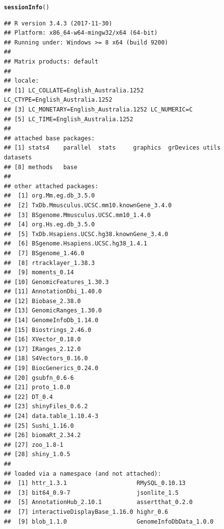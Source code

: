 \documentclass[12pt]{article}\usepackage[]{graphicx}\usepackage[]{color}
\makeatletter
\newcommand{\hlstd}[1]{\textcolor[rgb]{0.345,0.345,0.345}{#1}}%
\newcommand{\hlkwd}[1]{\textcolor[rgb]{0.737,0.353,0.396}{\textbf{#1}}}%
\newenvironment{kframe}{%
 \def\at@end@of@kframe{}%
 \ifinner\ifhmode%
  \def\at@end@of@kframe{\end{minipage}}%
  \begin{minipage}{\columnwidth}%
 \fi\fi%
 \def\FrameCommand##1{\hskip\@totalleftmargin \hskip-\fboxsep
 \colorbox{shadecolor}{##1}\hskip-\fboxsep
     \hskip-\linewidth \hskip-\@totalleftmargin \hskip\columnwidth}%
 \MakeFramed {\advance\hsize-\width
   \@totalleftmargin\z@ \linewidth\hsize
   \@setminipage}}%
 {\par\unskip\endMakeFramed%
 \at@end@of@kframe}
\newenvironment{knitrout}{}{} %
\makeatother
\begin{document}
\begin{knitrout}
\color{fgcolor}\begin{kframe}
\begin{alltt}
\hlkwd{sessionInfo}\hlstd{()}
\end{alltt}
\begin{verbatim}
## R version 3.4.3 (2017-11-30)
## Platform: x86_64-w64-mingw32/x64 (64-bit)
## Running under: Windows >= 8 x64 (build 9200)
## 
## Matrix products: default
## 
## locale:
## [1] LC_COLLATE=English_Australia.1252  LC_CTYPE=English_Australia.1252   
## [3] LC_MONETARY=English_Australia.1252 LC_NUMERIC=C                      
## [5] LC_TIME=English_Australia.1252    
## 
## attached base packages:
## [1] stats4    parallel  stats     graphics  grDevices utils     datasets 
## [8] methods   base     
## 
## other attached packages:
##  [1] org.Mm.eg.db_3.5.0                      
##  [2] TxDb.Mmusculus.UCSC.mm10.knownGene_3.4.0
##  [3] BSgenome.Mmusculus.UCSC.mm10_1.4.0      
##  [4] org.Hs.eg.db_3.5.0                      
##  [5] TxDb.Hsapiens.UCSC.hg38.knownGene_3.4.0 
##  [6] BSgenome.Hsapiens.UCSC.hg38_1.4.1       
##  [7] BSgenome_1.46.0                         
##  [8] rtracklayer_1.38.3                      
##  [9] moments_0.14                            
## [10] GenomicFeatures_1.30.3                  
## [11] AnnotationDbi_1.40.0                    
## [12] Biobase_2.38.0                          
## [13] GenomicRanges_1.30.0                    
## [14] GenomeInfoDb_1.14.0                     
## [15] Biostrings_2.46.0                       
## [16] XVector_0.18.0                          
## [17] IRanges_2.12.0                          
## [18] S4Vectors_0.16.0                        
## [19] BiocGenerics_0.24.0                     
## [20] gsubfn_0.6-6                            
## [21] proto_1.0.0                             
## [22] DT_0.4                                  
## [23] shinyFiles_0.6.2                        
## [24] data.table_1.10.4-3                     
## [25] Sushi_1.16.0                            
## [26] biomaRt_2.34.2                          
## [27] zoo_1.8-1                               
## [28] shiny_1.0.5                             
## 
## loaded via a namespace (and not attached):
##  [1] httr_1.3.1                    RMySQL_0.10.13               
##  [3] bit64_0.9-7                   jsonlite_1.5                 
##  [5] AnnotationHub_2.10.1          assertthat_0.2.0             
##  [7] interactiveDisplayBase_1.16.0 highr_0.6                    
##  [9] blob_1.1.0                    GenomeInfoDbData_1.0.0       

\end{verbatim}
\end{kframe}
\end{knitrout}
\end{document}
